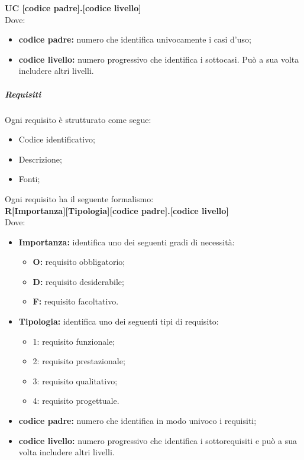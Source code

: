 \textbf{ UC [codice padre].[codice livello]} \\ 

Dove:
\begin{itemize}
\item{\textbf{ codice padre:}}  numero che identifica univocamente i casi d’uso;
\item{\textbf{ codice livello:}}  numero progressivo che identifica i sottocasi. Può a sua volta includere altri livelli.
\end{itemize}
\subparagraph{Requisiti}
Ogni requisito è strutturato come segue:

\begin{itemize}
	\item Codice identificativo;
	\item Descrizione;
	\item Fonti;
\end{itemize}
Ogni requisito ha il seguente formalismo:\\

\textbf{ R[Importanza][Tipologia][codice padre].[codice livello]} \\

Dove:
\begin{itemize}
	\item \textbf{Importanza:} identifica uno dei seguenti gradi di necessità:
	\begin{itemize}
		\item \textbf{O:} requisito obbligatorio;
		\item \textbf{D:} requisito desiderabile;
		\item \textbf{F:} requisito facoltativo.
		
	\end{itemize}
	\item \textbf{Tipologia:}  identifica uno dei seguenti tipi di requisito:
	\begin{itemize}
	\item 1: requisito funzionale;
	\item 2: requisito prestazionale;
	\item 3: requisito qualitativo;
	\item 4: requisito progettuale.
	
	\end{itemize}
	\item \textbf{codice padre:} numero che identifica in modo univoco i requisiti;
	\item \textbf{codice livello:} numero progressivo che identifica i sottorequisiti e può a sua volta includere altri livelli.
\end{itemize}
